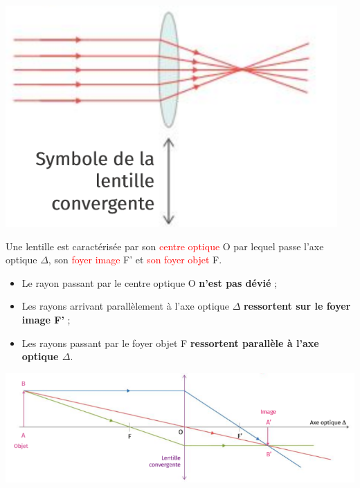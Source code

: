 \begin{tcolorbox}[colback=green!5!white,colframe=green!75!black,title=\textbf{Lentille convergente :}]
\begin{multicols}{2}
    \includegraphics[scale=0.7]{Images/Lentille.PNG}
    
    Une lentille est caractérisée par son \textcolor{red}{centre optique} O par lequel passe l'axe optique $\Delta$, son \textcolor{red}{foyer image} F' et \textcolor{red}{son foyer objet} F.
\end{multicols}
\end{tcolorbox}


\begin{tcolorbox}[colback=red!5!white,colframe=red!75!black,title=\textbf{Construction d'une image par une lentille :}]
\begin{itemize}
    \item Le rayon passant par le centre optique O \textbf{n'est pas dévié} ;
    \item Les rayons arrivant parallèlement à l'axe optique $\Delta$ \textbf{ressortent sur le foyer image F'} ;
    \item Les rayons passant par le foyer objet F \textbf{ressortent parallèle à l'axe optique $\Delta$}.
\end{itemize}
\end{tcolorbox}

\begin{center}
\includegraphics[scale=1]{Images/Lentille_construction.png}
\end{center}


